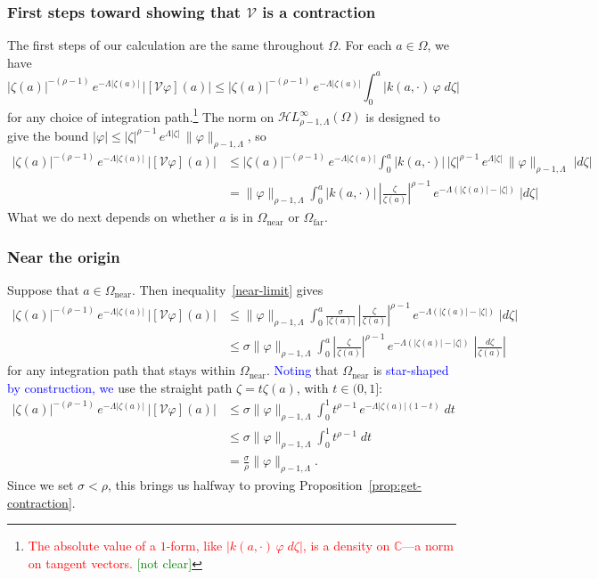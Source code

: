 \documentclass[review]{siamart220329}
\newcommand{\C}{\mathbb{C}}
\newcommand{\singexp}[2]{\mathcal{H}L^\infty_{#1, #2}}
\newcommand{\volterra}{\mathcal{V}}
\newcommand{\domain}{\Omega}
\newcommand{\near}{\Omega_\text{near}}
\newcommand{\far}{\Omega_\text{far}}
\begin{document}
\subsubsection{First steps toward showing that $\volterra$ is a contraction}\label{first-steps}
The first steps of our calculation are the same throughout $\domain$. For each $a \in \domain$, we have
\[ |\zeta(a)|^{-(\rho-1)}\,e^{-\Lambda|\zeta(a)|}\,|[\volterra\varphi](a)| \le |\zeta(a)|^{-(\rho-1)}\,e^{-\Lambda|\zeta(a)|}  \int_0^a |k(a, \cdot)\,\varphi\;d\zeta| \]
for any choice of integration path.\footnote{\textcolor{red}{The absolute value of a $1$-form, like $|k(a, \cdot)\,\varphi\;d\zeta|$, is a density on $\C$---a norm on tangent vectors.} \textcolor{green}{[not clear]}} The norm on $\singexp{\rho-1}{\Lambda}(\domain)$ is designed to give the bound $|\varphi| \le |\zeta|^{\rho-1}\,e^{\Lambda |\zeta|}\,\|\varphi\|_{\rho-1, \Lambda}$, so
\begin{align*}
|\zeta(a)|^{-(\rho-1)}\,e^{-\Lambda|\zeta(a)|}\,|[\volterra\varphi](a)| & \le |\zeta(a)|^{-(\rho-1)}\,e^{-\Lambda|\zeta(a)|}  \int_0^a |k(a, \cdot)|\,|\zeta|^{\rho-1}\,e^{\Lambda |\zeta|}\,\|\varphi\|_{\rho-1, \Lambda}\;|d\zeta| \\
& = \|\varphi\|_{\rho-1, \Lambda}  \int_0^a |k(a, \cdot)|\,\left|\frac{\zeta}{\zeta(a)}\right|^{\rho-1}\,e^{-\Lambda(|\zeta(a)| - |\zeta|)}\;|d\zeta|
\end{align*}
What we do next depends on whether $a$ is in $\near$ or $\far$.
\subsubsection{Near the origin}\label{near-bound}
Suppose that $a \in \near$. Then inequality~\eqref{near-limit} gives
\begin{align*}
|\zeta(a)|^{-(\rho-1)}\,e^{-\Lambda|\zeta(a)|}\,|[\volterra\varphi](a)| & \le
\|\varphi\|_{\rho-1, \Lambda}  \int_0^a \frac{\sigma}{|\zeta(a)|}\,\left|\frac{\zeta}{\zeta(a)}\right|^{\rho-1}\,e^{-\Lambda(|\zeta(a)| - |\zeta|)}\;|d\zeta| \\
& \le \sigma \|\varphi\|_{\rho-1, \Lambda}  \int_0^a \left|\frac{\zeta}{\zeta(a)}\right|^{\rho-1}\,e^{-\Lambda(|\zeta(a)| - |\zeta|)}\;\left|\frac{d\zeta}{\zeta(a)}\right|
\end{align*}
for any integration path that stays within $\near$. \textcolor{blue}{Noting} that $\near$ is \textcolor{blue}{star-shaped by construction, we} use the straight path $\zeta = t \zeta(a)$, with $t \in (0, 1]$:
\begin{align*}
|\zeta(a)|^{-(\rho-1)}\,e^{-\Lambda|\zeta(a)|}\,|[\volterra\varphi](a)| & \le \sigma \|\varphi\|_{\rho-1, \Lambda} \int_0^1 t^{\rho-1}\,e^{-\Lambda |\zeta(a)|(1 - t)}\;dt \\
& \le \sigma \|\varphi\|_{\rho-1, \Lambda} \int_0^1 t^{\rho-1}\;dt \\
& = \frac{\sigma}{\rho} \|\varphi\|_{\rho-1, \Lambda}.
\end{align*}
Since we set $\sigma < \rho$, this brings us halfway to proving Proposition~\ref{prop:get-contraction}.
\end{document}
